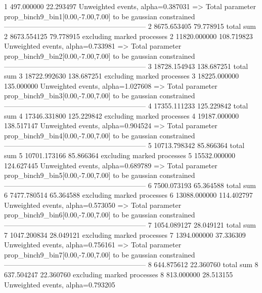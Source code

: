1          497.000000      22.293497       Unweighted events, alpha=0.387031
  => Total parameter prop_binch9_bin1[0.00,-7.00,7.00] to be gaussian constrained
------------------------------------------------------------
2          8675.653405     79.778915       total sum                     
2          8673.554125     79.778915       excluding marked processes    
2          11820.000000    108.719823      Unweighted events, alpha=0.733981
  => Total parameter prop_binch9_bin2[0.00,-7.00,7.00] to be gaussian constrained
------------------------------------------------------------
3          18728.154943    138.687251      total sum                     
3          18722.992630    138.687251      excluding marked processes    
3          18225.000000    135.000000      Unweighted events, alpha=1.027608
  => Total parameter prop_binch9_bin3[0.00,-7.00,7.00] to be gaussian constrained
------------------------------------------------------------
4          17355.111233    125.229842      total sum                     
4          17346.331800    125.229842      excluding marked processes    
4          19187.000000    138.517147      Unweighted events, alpha=0.904524
  => Total parameter prop_binch9_bin4[0.00,-7.00,7.00] to be gaussian constrained
------------------------------------------------------------
5          10713.798342    85.866364       total sum                     
5          10701.173166    85.866364       excluding marked processes    
5          15532.000000    124.627445      Unweighted events, alpha=0.689789
  => Total parameter prop_binch9_bin5[0.00,-7.00,7.00] to be gaussian constrained
------------------------------------------------------------
6          7500.073193     65.364588       total sum                     
6          7477.780514     65.364588       excluding marked processes    
6          13088.000000    114.402797      Unweighted events, alpha=0.573050
  => Total parameter prop_binch9_bin6[0.00,-7.00,7.00] to be gaussian constrained
------------------------------------------------------------
7          1054.089127     28.049121       total sum                     
7          1047.200834     28.049121       excluding marked processes    
7          1394.000000     37.336309       Unweighted events, alpha=0.756161
  => Total parameter prop_binch9_bin7[0.00,-7.00,7.00] to be gaussian constrained
------------------------------------------------------------
8          644.875612      22.360760       total sum                     
8          637.504247      22.360760       excluding marked processes    
8          813.000000      28.513155       Unweighted events, alpha=0.793205
